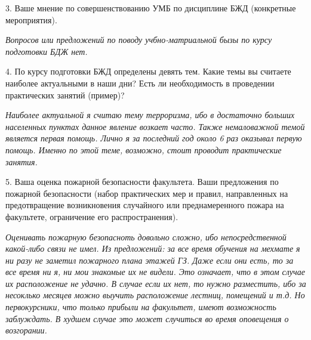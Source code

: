 \documentclass[a4paper, 12pt]{article}
\theoremstyle{definition}
\begin{document}
    3. Ваше мнение по совершенствованию УМБ по дисциплине БЖД (конкретные мероприятия).

    \textit{Вопросов или предложений по поводу учбно-матриальной бызы по курсу подготовки БДЖ нет.}

    4. По курсу подготовки БЖД определены девять
    тем. Какие темы вы считаете наиболее
    актуальными в наши дни? Есть ли необходимость
    в проведении практических занятий (пример)?

    \textit{Наиболее актуальной я считаю тему терроризма, ибо в достаточно больших населенных пунктах данное явление возкает часто. Также немаловажной темой является первая помощь. Лично я за последний год около 6 раз оказывал первую помощь. Именно по этой теме, возможно, стоит проводит практические занятия.}

    5. Ваша оценка пожарной безопасности факультета.
    Ваши предложения по пожарной безопасности
    (набор практических мер и правил, направленных
    на предотвращение возникновения случайного
    или преднамеренного пожара на факультете,
    ограничение его распространения).

    \textit{Оценивать пожарную безопасноть довольно сложно, ибо непосредственной какой-либо связи не имел. Из предложений: за все время обучения на мехмате я ни разу не заметил пожарного плана этажей ГЗ. Даже если они есть, то за все время ни я, ни мои знакомые их не видели. Это означает, что в этом случае их расположение не удачно. В случае если их нет, то нужно разместить, ибо за несоклько месяцев можно выучить расположение лестниц, помещений и т.д. Но первокурсники, что только прибыли на факультет, имеют возможность заблуждать. В худшем случае это может случиться во время оповещения о возгорании.}
\end{document}
